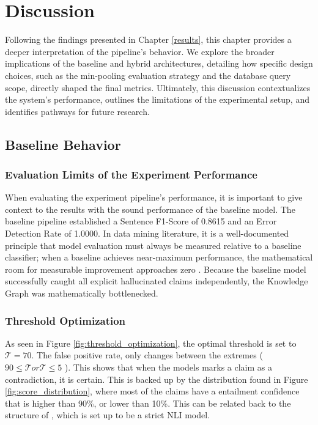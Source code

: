 \chapter{Discussion}\label{discussion}
Following the findings presented in Chapter \ref{results}, this chapter provides a deeper interpretation of the pipeline's behavior. We explore the broader implications of the baseline and hybrid architectures, detailing how specific design choices, such as the min-pooling evaluation strategy and the database query scope, directly shaped the final metrics. Ultimately, this discussion contextualizes the system's performance, outlines the limitations of the experimental setup, and identifies pathways for future research.

\section{Baseline Behavior}
\subsection{Evaluation Limits of the Experiment Performance}
When evaluating the experiment pipeline's performance, it is important to give context to the results with the sound performance of the baseline model. The baseline pipeline established a Sentence F1-Score of 0.8615 and an Error Detection Rate of 1.0000. In data mining literature, it is a well-documented principle that model evaluation must always be measured relative to a baseline classifier; when a baseline achieves near-maximum performance, the mathematical room for measurable improvement approaches zero \cite{tan2019introduction}. Because the baseline model successfully caught all explicit hallucinated claims independently, the Knowledge Graph was mathematically bottlenecked. 





\subsection{Threshold Optimization}
As seen in Figure \ref{fig:threshold_optimization}, the optimal threshold is set to $\mathcal{T} = 70$. The false positive rate, only changes between the extremes ($ 90 \le \mathcal{T} or \mathcal{T} \le 5$ ). This shows that when the models marks a claim as a contradiction, it is certain. This is backed up by the distribution found in Figure \ref{fig:score_distribution}, where most of the claims have a entailment confidence that is higher than 90\%, or lower than 10\%. This can be related back to the structure of \rob, which is set up to be a strict NLI model. 

